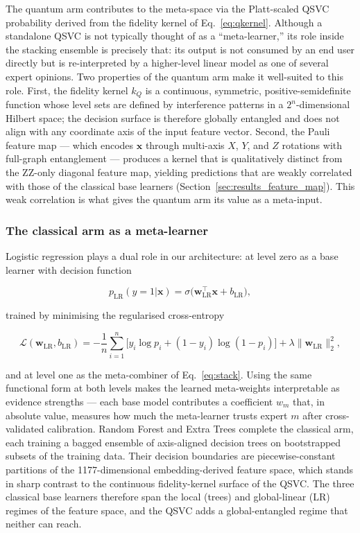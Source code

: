 \documentclass[twocolumn,10pt]{article}
\begin{document}
The quantum arm contributes to the meta-space via the Platt-scaled QSVC probability derived from the fidelity kernel of Eq.~\eqref{eq:qkernel}. Although a standalone QSVC is not typically thought of as a ``meta-learner,'' its role inside the stacking ensemble is precisely that: its output is not consumed by an end user directly but is re-interpreted by a higher-level linear model as one of several expert opinions. Two properties of the quantum arm make it well-suited to this role. First, the fidelity kernel $k_{Q}$ is a continuous, symmetric, positive-semidefinite function whose level sets are defined by interference patterns in a $2^{n}$-dimensional Hilbert space; the decision surface is therefore globally entangled and does not align with any coordinate axis of the input feature vector. Second, the Pauli feature map --- which encodes $\mathbf{x}$ through multi-axis $X$, $Y$, and $Z$ rotations with full-graph entanglement --- produces a kernel that is qualitatively distinct from the ZZ-only diagonal feature map, yielding predictions that are weakly correlated with those of the classical base learners (Section~\ref{sec:results_feature_map}). This weak correlation is what gives the quantum arm its value as a meta-input.

\subsubsection*{The classical arm as a meta-learner}

Logistic regression plays a dual role in our architecture: at level zero as a base learner with decision function

\begin{equation}
p_{\mathrm{LR}}(y=1|\mathbf{x}) = \sigma\bigl(\mathbf{w}_{\mathrm{LR}}^{\top}\mathbf{x} + b_{\mathrm{LR}}\bigr),
\end{equation}

trained by minimising the regularised cross-entropy

\begin{equation}
\mathcal{L}(\mathbf{w}_{\mathrm{LR}}, b_{\mathrm{LR}}) = -\frac{1}{n}\sum_{i=1}^{n}\bigl[y_i \log p_i + (1-y_i)\log(1-p_i)\bigr] + \lambda \|\mathbf{w}_{\mathrm{LR}}\|_{2}^{2},
\end{equation}

and at level one as the meta-combiner of Eq.~\eqref{eq:stack}. Using the same functional form at both levels makes the learned meta-weights interpretable as evidence strengths --- each base model contributes a coefficient $w_{m}$ that, in absolute value, measures how much the meta-learner trusts expert $m$ after cross-validated calibration. Random Forest and Extra Trees complete the classical arm, each training a bagged ensemble of axis-aligned decision trees on bootstrapped subsets of the training data. Their decision boundaries are piecewise-constant partitions of the 1177-dimensional embedding-derived feature space, which stands in sharp contrast to the continuous fidelity-kernel surface of the QSVC. The three classical base learners therefore span the local (trees) and global-linear (LR) regimes of the feature space, and the QSVC adds a global-entangled regime that neither can reach.
\end{document}
